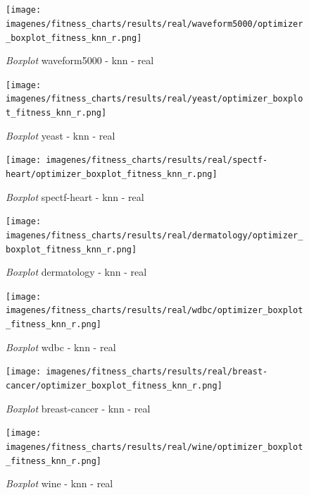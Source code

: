 \chapter{}

\begin{figure}[htp]
    \centering
    \texttt{[image: imagenes/fitness\_charts/results/real/waveform5000/optimizer\_boxplot\_fitness\_knn\_r.png]}
    \caption{\textit{Boxplot} waveform5000 - knn - real}

\end{figure}

\begin{figure}[htp]
    \centering
    \texttt{[image: imagenes/fitness\_charts/results/real/yeast/optimizer\_boxplot\_fitness\_knn\_r.png]}
    \caption{\textit{Boxplot} yeast - knn - real}

\end{figure}

\begin{figure}[htp]
    \centering
    \texttt{[image: imagenes/fitness\_charts/results/real/spectf-heart/optimizer\_boxplot\_fitness\_knn\_r.png]}
    \caption{\textit{Boxplot} spectf-heart - knn - real}

\end{figure}

\begin{figure}[htp]
    \centering
    \texttt{[image: imagenes/fitness\_charts/results/real/dermatology/optimizer\_boxplot\_fitness\_knn\_r.png]}
    \caption{\textit{Boxplot} dermatology - knn - real}

\end{figure}

\begin{figure}[htp]
    \centering
    \texttt{[image: imagenes/fitness\_charts/results/real/wdbc/optimizer\_boxplot\_fitness\_knn\_r.png]}
    \caption{\textit{Boxplot} wdbc - knn - real}

\end{figure}

\begin{figure}[htp]
    \centering
    \texttt{[image: imagenes/fitness\_charts/results/real/breast-cancer/optimizer\_boxplot\_fitness\_knn\_r.png]}
    \caption{\textit{Boxplot} breast-cancer - knn - real}

\end{figure}

\begin{figure}[htp]
    \centering
    \texttt{[image: imagenes/fitness\_charts/results/real/wine/optimizer\_boxplot\_fitness\_knn\_r.png]}
    \caption{\textit{Boxplot} wine - knn - real}

\end{figure}

